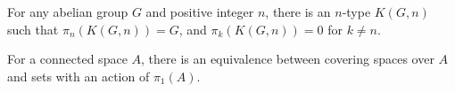 \begin{thm}\label{Eilenberg-Mac-Lane-Spaces}
For any abelian group $G$ and positive integer $n$, there is an $n$-type
$K(G,n)$ such that $\pi_n(K(G,n)) = G$, and  $\pi_k(K(G,n)) = 0$
for $k\neq n$.
\end{thm}

\begin{thm}\label{thm:covering-spaces}
  For a connected space $A$, there is an equivalence between covering spaces over $A$ and sets with an action of $\pi_1(A)$.
\end{thm}


\sectionNotes


